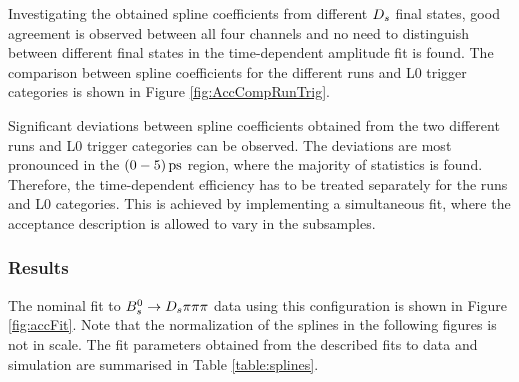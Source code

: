 Investigating the obtained spline coefficients from different ${{D}_{s}}$ final states, 
good agreement is observed between all four channels and no need to distinguish between different final states in the time-dependent amplitude fit is found. \newline
The comparison between spline coefficients for the different runs and L0 trigger categories is shown in Figure \ref{fig:AccCompRunTrig}.

Significant deviations between spline coefficients obtained from the two different runs and L0 trigger categories can be observed. 
The deviations are most pronounced in the $(0-5) {\mathrm{ \,ps}}$ region, where the majority of statistics is found. 
Therefore, the time-dependent efficiency has to be treated separately for the runs and L0 categories. 
This is achieved by implementing a simultaneous fit, where the acceptance description is allowed to vary in the subsamples.   

\clearpage
\subsubsection{Results}

The nominal fit to ${{B}^0_{s}}\rightarrow{\ensuremath{{D}_{s}}}{\ensuremath{\pi}}{\ensuremath{\pi}}{\ensuremath{\pi}}$ data using this configuration is shown in Figure \ref{fig:accFit}. 
Note that the normalization of the splines in the following figures is not in scale.
The fit parameters obtained from the described fits to data and simulation are summarised in Table \ref{table:splines}.

